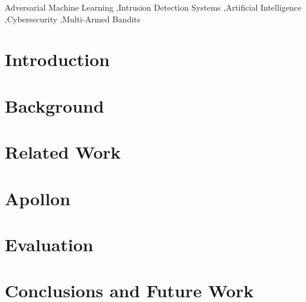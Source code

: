 \documentclass[a4paper,fleqn]{cas-dc}
\begin{document}
    \begin{keywords}
        Adversarial Machine Learning \sep Intrusion Detection Systems \sep Artificial Intelligence \sep Cybersecurity
        \sep Multi-Armed Bandits
    \end{keywords}

    \maketitle



    \section{Introduction}\label{sec:introduction}
    



    \section{Background}\label{sec:background}
    



    \section{Related Work}\label{sec:related-work}
    
    



    \section{Apollon}\label{sec:proposal}
    



    \section{Evaluation}\label{sec:evaluation}
    



    \section{Conclusions and Future Work}\label{sec:conclusions-and-future-work}
    


    
    



\end{document}
